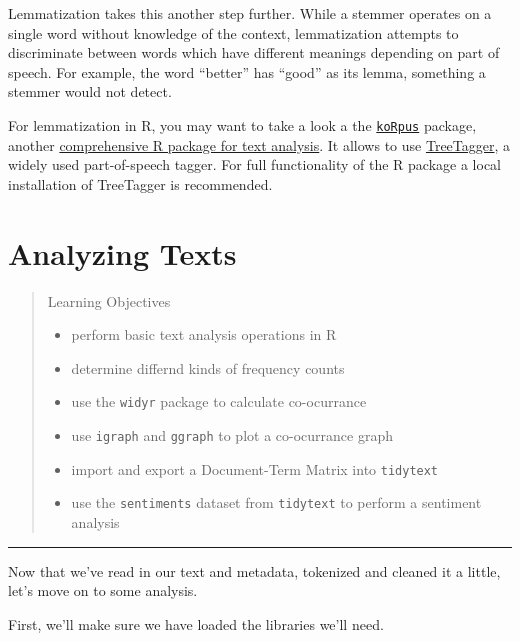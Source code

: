 \documentclass[]{book}
\providecommand{\tightlist}{%
  \setlength{\itemsep}{0pt}\setlength{\parskip}{0pt}}
\begin{document}
Lemmatization takes this another step further. While a stemmer operates on a single word without knowledge of the context, lemmatization attempts to discriminate between words which have different meanings depending on part of speech. For example, the word ``better'' has ``good'' as its lemma, something a stemmer would not detect.

For lemmatization in R, you may want to take a look a the \href{https://CRAN.R-project.org/package=koRpus}{\texttt{koRpus}} package, another \href{https://cran.r-project.org/web/packages/koRpus/vignettes/koRpus_vignette.html}{comprehensive R package for text analysis}. It allows to use \href{http://www.cis.uni-muenchen.de/~schmid/tools/TreeTagger/}{TreeTagger}, a widely used part-of-speech tagger. For full functionality of the R package a local installation of TreeTagger is recommended.

\hypertarget{textanalysis}{%
\chapter{Analyzing Texts}\label{textanalysis}}

\begin{quote}
Learning Objectives

\begin{itemize}
\tightlist
\item
  perform basic text analysis operations in R
\item
  determine differnd kinds of frequency counts
\item
  use the \texttt{widyr} package to calculate co-ocurrance
\item
  use \texttt{igraph} and \texttt{ggraph} to plot a co-ocurrance graph
\item
  import and export a Document-Term Matrix into \texttt{tidytext}
\item
  use the \texttt{sentiments} dataset from \texttt{tidytext} to perform a sentiment analysis
\end{itemize}
\end{quote}

\begin{center}\rule{0.5\linewidth}{\linethickness}\end{center}

Now that we've read in our text and metadata, tokenized and cleaned it a little, let's move on to some analysis.

First, we'll make sure we have loaded the libraries we'll need.
\end{document}
